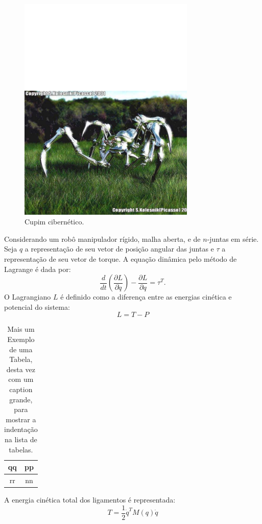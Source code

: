 \begin{figure}[ht]
\centering
\includegraphics[width=0.75\textwidth]{texts/cap2/figs/spiderrobot}
\caption{Cupim cibernético.}\label{FDIII}
\end{figure}

Considerando um robô manipulador rígido, malha aberta, e de $n$-juntas em série. Seja $q$ a representação de seu vetor de posição angular das juntas  e $\tau$ a representação de seu vetor de torque. A equação dinâmica pelo método de
Lagrange é dada por:
\begin{equation} \label{eq:lagr1}
\frac{d}{dt}(\frac{\partial L}{\partial \dot{q}})-\frac{\partial L}{\partial q}=\tau^{T}.
\end{equation}
O Lagrangiano $L$ é definido como a diferença entre as energias cinética e potencial do sistema:
\begin{equation} \label{L}
L=T-P
\end{equation}

\begin{table}
  \caption{Mais um Exemplo de uma Tabela, desta vez com um caption grande, para mostrar a indentação na lista de tabelas.}
  \label{minhatab2}

  \center
  \begin{tabular}{|c|c|}
    \hline
    qq & pp \\ \hline
    rr & nn \\ \hline
  \end{tabular}
\end{table}

A energia cinética total dos ligamentos é representada:
\begin{equation} \label{energT}
T=\frac{1}{2}\dot{q}^{T}M(q)\dot{q}
\end{equation}
